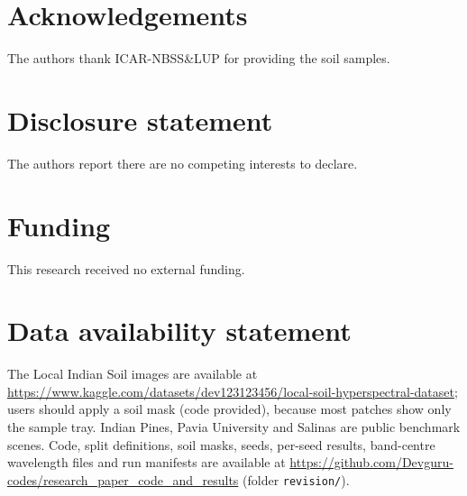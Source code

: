 \documentclass[]{interact}
\begin{document}
\section*{Acknowledgements}
The authors thank ICAR-NBSS\&LUP for providing the soil samples.

\section*{Disclosure statement}
The authors report there are no competing interests to declare.

\section*{Funding}
This research received no external funding.

\section*{Data availability statement}
The Local Indian Soil images are available at \url{https://www.kaggle.com/datasets/dev123123456/local-soil-hyperspectral-dataset}; users should apply a soil mask (code provided), because most patches show only the sample tray. Indian Pines, Pavia University and Salinas are public benchmark scenes. Code, split definitions, soil masks, seeds, per-seed results, band-centre wavelength files and run manifests are available at \url{https://github.com/Devguru-codes/research_paper_code_and_results} (folder \texttt{revision/}).



\end{document}
